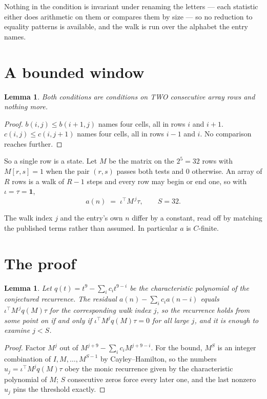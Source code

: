 \documentclass[11pt,a4paper]{article}
\theoremstyle{plain}
\newtheorem{lemma}[theorem]{Lemma}
\theoremstyle{definition}
\begin{document}
Nothing in the condition is invariant under renaming the letters --- each statistic either does
arithmetic on them or compares them by size --- so no reduction to equality patterns is
available, and the walk is run over the alphabet the entry names.

\section{A bounded window}

\begin{lemma}\label{lem:win}
Both conditions are conditions on TWO consecutive array rows and nothing more.
\end{lemma}

\begin{proof}
$b(i,j)\le b(i{+}1,j)$ names four cells, all in rows $i$ and $i+1$. $c(i,j)\le c(i,j{+}1)$
names four cells, all in rows $i-1$ and $i$. No comparison reaches further.
\end{proof}

So a single row is a state. Let $M$ be the matrix on the $2^{5}=32$ rows with
$M[r,s]=1$ when the pair $(r,s)$ passes both tests and $0$ otherwise. An array of $R$ rows is a
walk of $R-1$ steps and every row may begin or end one, so with $\iota=\tau=\mathbf{1}$,
\[
a(n)\;=\;\iota^{\!\top}M^{\,j}\tau ,\qquad S=32.
\]

The walk index $j$ and the entry's own $n$ differ by a constant, read off by matching the
published terms rather than assumed. In particular $a$ is $C$-finite.

\section{The proof}

\begin{lemma}\label{lem:crit}
Let $q(t)=t^{9}-\sum_i c_it^{9-i}$ be the characteristic polynomial of the
conjectured recurrence. The residual $a(n)-\sum_ic_ia(n-i)$ equals
$\iota^{\!\top}M^{\,j}q(M)\tau$ for the corresponding walk index $j$, so the recurrence
holds from some point on if and only if $\iota^{\!\top}M^{j}q(M)\tau=0$ for all large $j$,
and it is enough to examine $j<S$.
\end{lemma}

\begin{proof}
Factor $M^{j}$ out of $M^{j+9}-\sum_ic_iM^{j+9-i}$. For the bound, $M^{S}$
is an integer combination of $I,M,\dots,M^{S-1}$ by Cayley--Hamilton, so the numbers
$u_j=\iota^{\!\top}M^{j}q(M)\tau$ obey the monic recurrence given by the characteristic
polynomial of $M$; $S$ consecutive zeros force every later one, and the last nonzero $u_j$
pins the threshold exactly.
\end{proof}
\end{document}
